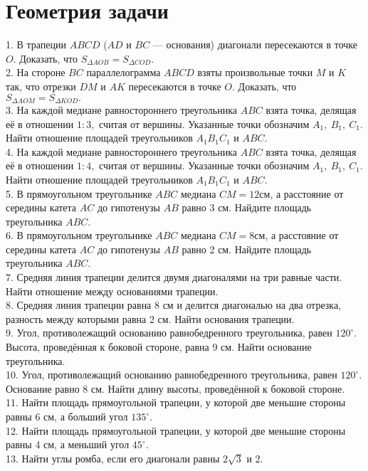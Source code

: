 \section{Геометрия задачи}
1. В трапеции $ABCD$ ($AD$ и $BC$ --- основания) диагонали пересекаются в точке $O.$ Доказать, что $S_{\Delta AOB}=S_{\Delta COD}.$\\
2. На стороне $BC$ параллелограмма $ABCD$ взяты произвольные точки $M$ и $K$ так, что отрезки $DM$ и $AK$ пересекаются в точке $O.$ Доказать, что $S_{\Delta AOM}=S_{\Delta KOD}.$\\
3. На каждой медиане равностороннего треугольника $ABC$ взята точка, делящая её в отношении $1:3,$ считая от вершины. Указанные точки обозначим $A_1,\ B_1,\ C_1.$ Найти отношение площадей треугольников $A_1B_1C_1$ и $ABC.$\\
4. На каждой медиане равностороннего треугольника $ABC$ взята точка, делящая её в отношении $1:4,$ считая от вершины. Указанные точки обозначим $A_1,\ B_1,\ C_1.$ Найти отношение площадей треугольников $A_1B_1C_1$ и $ABC.$\\
5. В прямоугольном треугольнике $ABC$ медиана $CM=12$см, а расстояние от середины катета $AC$ до гипотенузы $AB$ равно 3 см. Найдите площадь треугольника $ABC.$\\
6. В прямоугольном треугольнике $ABC$ медиана $CM=8$см, а расстояние от середины катета $AC$ до гипотенузы $AB$ равно 2 см. Найдите площадь треугольника $ABC.$\\
7. Средняя линия трапеции делится двумя диагоналями на три равные части. Найти отношение между основаниями трапеции.\\
8. Средняя линия трапеции равна 8 см и делится диагональю на два отрезка, разность между которыми равна 2 см. Найти основания трапеции.\\
9. Угол, противолежащий основанию равнобедренного треугольника, равен $120^\circ.$ Высота, проведённая к боковой стороне, равна 9 см. Найти основание треугольника.\\
10. Угол, противолежащий основанию равнобедренного треугольника, равен $120^\circ.$ Основание равно 8 см. Найти длину высоты, проведённой к боковой стороне.\\
11. Найти площадь прямоугольной трапеции, у которой две меньшие стороны равны 6 см, а больший угол $135^\circ.$\\
12. Найти площадь прямоугольной трапеции, у которой две меньшие стороны равны 4 см, а меньший угол $45^\circ.$\\
13. Найти углы ромба, если его диагонали равны $2\sqrt{3}$ и $2.$\\
